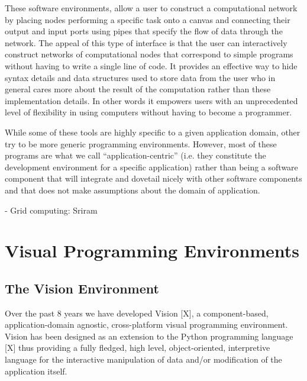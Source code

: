 \documentclass[conference]{IEEEtran}
\begin{document}
These software environments, allow a user to construct a computational
network by placing nodes performing a specific task onto a canvas and
connecting their output and input ports using pipes that specify the flow
of data through the network. The appeal of this type of interface is that
the user can interactively construct networks of computational nodes that
correspond to simple programs without having to write a single line of
code. It provides an effective way to hide syntax details and data
structures used to store data from the user who in general cares more about
the result of the computation rather than these implementation details. In
other words it empowers users with an unprecedented level of flexibility in
using computers without having to become a programmer.

While some of these tools are highly specific to a given application
domain, other try to be more generic programming environments. However,
most of these programs are what we call “application-centric” (i.e. they
constitute the development environment for a specific application) rather
than being a software component that will integrate and dovetail nicely
with other software components and that does not make assumptions about the
domain of application.

- Grid computing: Sriram

\section {Visual Programming Environments}

\subsection {The Vision Environment}



Over the past 8 years we have developed Vision [X], a component-based,
application-domain agnostic, cross-platform visual programming environment.
Vision has been designed as an extension to the Python programming language
[X] thus providing a fully fledged, high level, object-oriented,
interpretive language for the interactive manipulation of data and/or
modification of the application itself.
\end{document}
